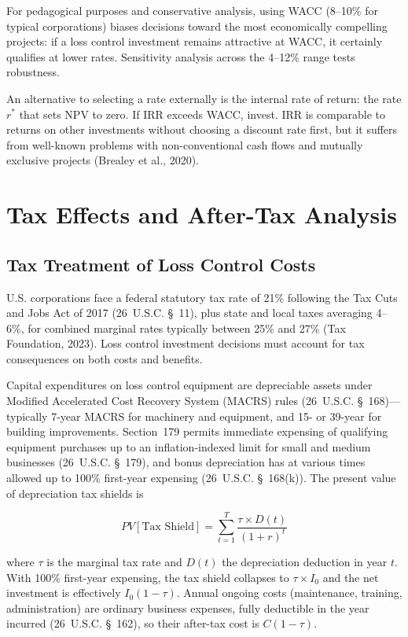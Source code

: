 \documentclass[11pt,openany]{book}
\begin{document}
For pedagogical purposes and conservative analysis, using WACC (8--10\% for
typical corporations) biases decisions toward the most economically compelling
projects: if a loss control investment remains attractive at WACC, it
certainly qualifies at lower rates. Sensitivity analysis across the 4--12\%
range tests robustness.

An alternative to selecting a rate externally is the internal rate of return:
the rate \(r^{*}\) that sets NPV to zero. If IRR exceeds WACC, invest. IRR is
comparable to returns on other investments without choosing a discount rate
first, but it suffers from well-known problems with non-conventional cash
flows and mutually exclusive projects (Brealey et al., 2020).

\section{Tax Effects and After-Tax Analysis}
\label{sec:appendix-tax}

\subsection{Tax Treatment of Loss Control Costs}

U.S. corporations face a federal statutory tax rate of 21\% following the Tax
Cuts and Jobs Act of 2017 (26~U.S.C. \S~11), plus state and local taxes
averaging 4--6\%, for combined marginal rates typically between 25\% and 27\%
(Tax Foundation, 2023). Loss control investment decisions must account for tax
consequences on both costs and benefits.

Capital expenditures on loss control equipment are depreciable assets under
Modified Accelerated Cost Recovery System (MACRS) rules (26~U.S.C.
\S~168)---typically 7-year MACRS for machinery and equipment, and 15- or
39-year for building improvements. Section~179 permits immediate expensing of
qualifying equipment purchases up to an inflation-indexed limit for small and
medium businesses (26~U.S.C. \S~179), and bonus depreciation has at various
times allowed up to 100\% first-year expensing (26~U.S.C. \S~168(k)). The
present value of depreciation tax shields is

\[
PV[\text{Tax Shield}] = \sum_{t=1}^{T} \frac{\tau \times D(t)}{(1+r)^t}
\]

where \(\tau\) is the marginal tax rate and \(D(t)\) the depreciation
deduction in year \(t\). With 100\% first-year expensing, the tax shield
collapses to \(\tau \times I_0\) and the net investment is effectively
\(I_0(1-\tau)\). Annual ongoing costs (maintenance, training, administration)
are ordinary business expenses, fully deductible in the year incurred
(26~U.S.C. \S~162), so their after-tax cost is \(C(1-\tau)\).
\end{document}
